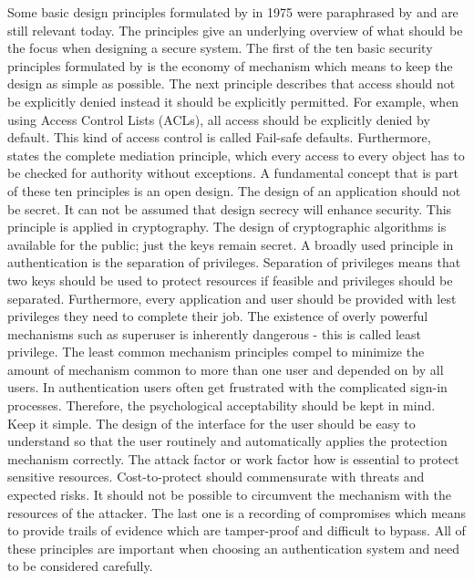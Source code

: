 Some basic design principles formulated by \cite{Saltzer:PICS} in 1975 were paraphrased by \cite{Neumann:2018:PTC} and are still relevant today. The principles give an underlying overview of what should be the focus when designing a secure system. The first of the ten basic security principles formulated by \cite{Saltzer:PICS} is the economy of mechanism which means to keep the design as simple as possible.
The next principle describes that access should not be explicitly denied instead it should be explicitly permitted. For example, when using Access Control Lists (ACLs), all access should be explicitly denied by default. This kind of access control is called Fail-safe defaults. Furthermore, \cite{Saltzer:PICS} states the complete mediation principle, which every access to every object has to be checked for authority without exceptions. A fundamental concept that is part of these ten principles is an open design. The design of an application should not be secret. It can not be assumed that design secrecy will enhance security. This principle is applied in cryptography. The design of cryptographic algorithms is available for the public; just the keys remain secret. A broadly used principle in authentication is the separation of privileges. Separation of privileges means that two keys should be used to protect resources if feasible and privileges should be separated.  Furthermore, every application and user should be provided with lest privileges they need to complete their job. The existence of overly powerful mechanisms such as superuser is inherently dangerous - this is called least privilege. The least common mechanism principles compel to minimize the amount of mechanism common to more than one user and depended on by all users. In authentication users often get frustrated with the complicated sign-in processes. Therefore, the psychological acceptability should be kept in mind. Keep it simple. The design of the interface for the user should be easy to understand so that the user routinely and automatically applies the protection mechanism correctly. The attack factor or work factor how \cite{Saltzer:PICS} is essential to protect sensitive resources. Cost-to-protect should commensurate with threats and expected risks. It should not be possible to circumvent the mechanism with the resources of the attacker.   
The last one is a recording of compromises which means to provide trails of evidence which are tamper-proof and difficult to bypass. All of these principles are important when choosing an authentication system and need to be considered carefully. 

